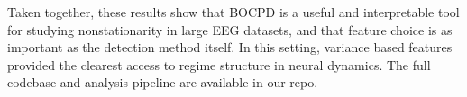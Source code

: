 \documentclass[11pt,letterpaper]{article}
\begin{document}
Taken together, these results show that BOCPD is a useful and interpretable tool for studying nonstationarity in large EEG datasets, and that feature choice is as important as the detection method itself. In this setting, variance based features provided the clearest access to regime structure in neural dynamics. The full codebase and analysis pipeline are available in our repo.
\newpage



\end{document}
